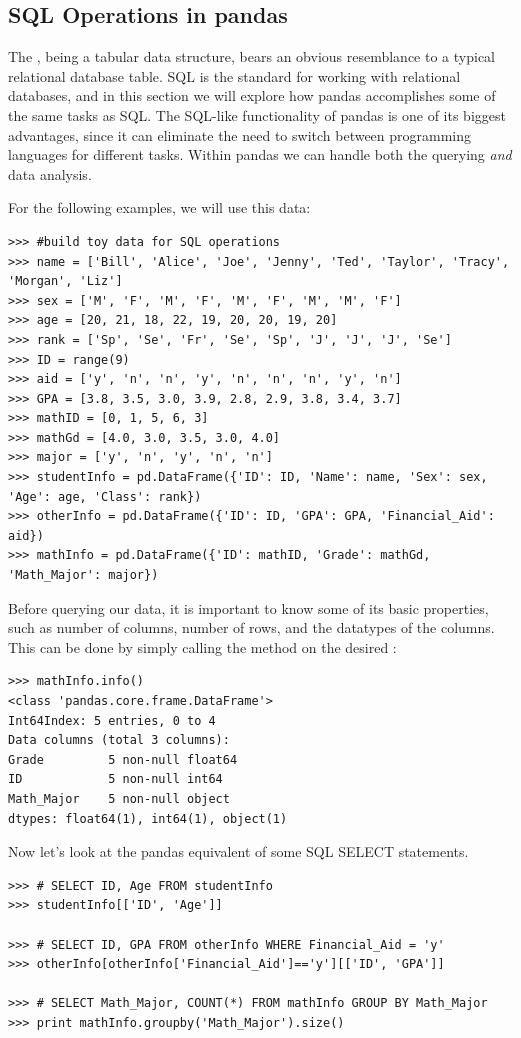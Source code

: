 \subsection*{SQL Operations in pandas}
The , being a tabular data structure, bears an obvious resemblance to a typical relational
database table. SQL is the standard for working with relational databases, and in this section we will
explore how pandas accomplishes some of the same tasks as SQL. The SQL-like functionality of pandas is
one of its biggest advantages, since it can eliminate the need to switch between programming languages
for different tasks. Within pandas we can handle both the querying \emph{and} data analysis.

For the following examples, we will use this data:
\begin{lstlisting}
>>> #build toy data for SQL operations
>>> name = ['Bill', 'Alice', 'Joe', 'Jenny', 'Ted', 'Taylor', 'Tracy', 'Morgan', 'Liz']
>>> sex = ['M', 'F', 'M', 'F', 'M', 'F', 'M', 'M', 'F']
>>> age = [20, 21, 18, 22, 19, 20, 20, 19, 20]
>>> rank = ['Sp', 'Se', 'Fr', 'Se', 'Sp', 'J', 'J', 'J', 'Se']
>>> ID = range(9)
>>> aid = ['y', 'n', 'n', 'y', 'n', 'n', 'n', 'y', 'n']
>>> GPA = [3.8, 3.5, 3.0, 3.9, 2.8, 2.9, 3.8, 3.4, 3.7]
>>> mathID = [0, 1, 5, 6, 3]
>>> mathGd = [4.0, 3.0, 3.5, 3.0, 4.0]
>>> major = ['y', 'n', 'y', 'n', 'n']
>>> studentInfo = pd.DataFrame({'ID': ID, 'Name': name, 'Sex': sex, 'Age': age, 'Class': rank})
>>> otherInfo = pd.DataFrame({'ID': ID, 'GPA': GPA, 'Financial_Aid': aid})
>>> mathInfo = pd.DataFrame({'ID': mathID, 'Grade': mathGd, 'Math_Major': major})
\end{lstlisting}

Before querying our data, it is important to know some of its basic properties, such as
number of columns, number of rows, and the datatypes of the columns. This can be done
by simply calling the  method on the desired :
\begin{lstlisting}
>>> mathInfo.info()
<class 'pandas.core.frame.DataFrame'>
Int64Index: 5 entries, 0 to 4
Data columns (total 3 columns):
Grade         5 non-null float64
ID            5 non-null int64
Math_Major    5 non-null object
dtypes: float64(1), int64(1), object(1)
\end{lstlisting}

Now let's look at the pandas equivalent of some SQL SELECT statements.
\begin{lstlisting}
>>> # SELECT ID, Age FROM studentInfo
>>> studentInfo[['ID', 'Age']]

>>> # SELECT ID, GPA FROM otherInfo WHERE Financial_Aid = 'y'
>>> otherInfo[otherInfo['Financial_Aid']=='y'][['ID', 'GPA']]

>>> # SELECT Math_Major, COUNT(*) FROM mathInfo GROUP BY Math_Major
>>> print mathInfo.groupby('Math_Major').size()
\end{lstlisting}

